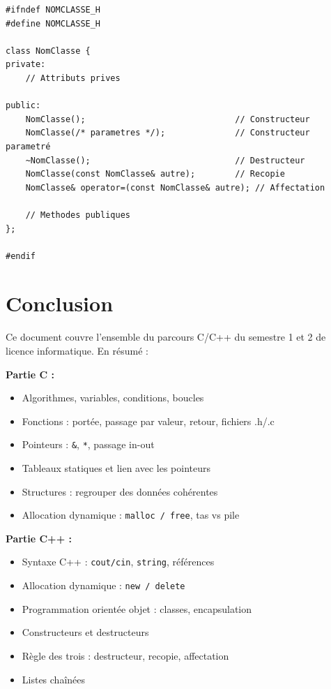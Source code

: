 \documentclass[12pt,a4paper]{article}
\begin{document}
\begin{lstlisting}[style=cpp, caption={Modèle de fichier .h}]
#ifndef NOMCLASSE_H
#define NOMCLASSE_H

class NomClasse {
private:
    // Attributs prives

public:
    NomClasse();                              // Constructeur
    NomClasse(/* parametres */);              // Constructeur parametré
    ~NomClasse();                             // Destructeur
    NomClasse(const NomClasse& autre);        // Recopie
    NomClasse& operator=(const NomClasse& autre); // Affectation

    // Methodes publiques
};

#endif
\end{lstlisting}

\section{Conclusion}

Ce document couvre l'ensemble du parcours C/C++ du semestre 1 et 2 de licence informatique. En résumé :

\textbf{Partie C :}
\begin{itemize}
    \item Algorithmes, variables, conditions, boucles
    \item Fonctions : portée, passage par valeur, retour, fichiers .h/.c
    \item Pointeurs : \texttt{\&}, \texttt{*}, passage in-out
    \item Tableaux statiques et lien avec les pointeurs
    \item Structures : regrouper des données cohérentes
    \item Allocation dynamique : \texttt{malloc / free}, tas vs pile
\end{itemize}

\textbf{Partie C++ :}
\begin{itemize}
    \item Syntaxe C++ : \texttt{cout/cin}, \texttt{string}, références
    \item Allocation dynamique : \texttt{new / delete}
    \item Programmation orientée objet : classes, encapsulation
    \item Constructeurs et destructeurs
    \item Règle des trois : destructeur, recopie, affectation
    \item Listes chaînées
\end{itemize}
\end{document}
